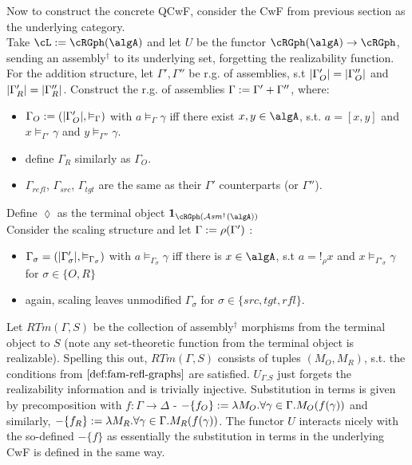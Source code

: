 \documentclass[12pt,a4paper]{article}
\def\cAsm{\mathcal{A}\mathit{sm}^\dagger}
\def\src{_{src}}\alwaysmath{src}
\def\rfl{_{refl}}\alwaysmath{rfl}
\def\tgt{_{tgt}}\alwaysmath{tgt}
\renewcommand{\O}{_{O}}\alwaysmath{O}
\def\R{_{R}}\alwaysmath{R}
\begin{document}
Now to construct the concrete QCwF, consider the CwF from previous section as the underlying category.\\
Take $\cL := \cRGph(\algA)$ and let $U$ be the functor $\cRGph(\algA) \to \cRGph$, sending an assembly$^\dagger$ to its underlying set, forgetting the realizability function.\\
For the addition structure, let $\Gamma', \Gamma''$ be r.g. of assemblies, s.t  $\carr{\Gamma'\O}=\carr{\Gamma''\O}$ and $\carr{\Gamma'\R}=\carr{\Gamma''\R}$. Construct the r.g. of assemblies $\Gamma := \Gamma' + \Gamma''$, where:
\begin{itemize}[noitemsep]
    \item $\Gamma\O \define (\carr{\Gamma'\O}, \vDash_\Gamma)$ with $ a \vDash_\Gamma \gamma$ iff there exist $x,y \in \algA$, s.t. $a = [x,y]$ and $x \vDash_{\Gamma'} \gamma$ and $ y \vDash_{\Gamma''} \gamma$.

    \item define $\Gamma\R$ similarly as $\Gamma\O$.

    \item $\Gamma\rfl$, $\Gamma\src$, $\Gamma\tgt$ are the same as their $\Gamma'$ counterparts (or $\Gamma''$).\\
\end{itemize}
Define $\lozenge$ as the terminal object $\mathbf{1}_{\cRGph(\cAsm(\algA))}$\\
Consider the scaling structure and let $\Gamma := \rho(\Gamma')$ :
  \begin{itemize}
    \item $\Gamma_\sigma = (|\Gamma'_\sigma|, \vDash_{\Gamma_\sigma})$ with $a \vDash_{\Gamma_\sigma} \gamma$ iff there is $x \in \algA$, s.t $a = !_\rho x$ and $x \vDash_{\Gamma'_\sigma} \gamma$ for $\sigma \in \{O, R\}$
    
    \item again, scaling leaves unmodified $\Gamma_\sigma$ for $\sigma\in\{src,tgt,rfl\}$.
\end{itemize}
Let $RTm(\Gamma, S)$ be the collection of assembly$^\dagger$ morphisms from the terminal object to $S$ (note any set-theoretic function from the terminal object is realizable). Spelling this out, $RTm(\Gamma, S)$ consists of tuples $(M\O, M\R)$, s.t. the conditions from $\cref{def:fam-refl-graphs}$ are satisfied. $U_{\Gamma.S}$ just forgets the realizability information and is trivially injective. Substitution in terms is given by precomposition with $f : \Gamma \to \Delta$ - $-\{f\O\} \define \lambda M\O. \forall \gamma \in \Gamma . M\O(f(\gamma))$ and similarly, $-\{f\R\} \define \lambda M\R . \forall \gamma \in \Gamma . M\R(f(\gamma))$. The functor $U$ interacts nicely with the so-defined $-\{f\}$ as essentially the substitution in terms in the underlying CwF is defined in the same way.\\
\end{document}
